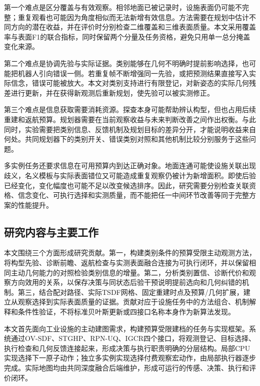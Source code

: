 \documentclass[11pt,a4paper]{article}
\numberwithin{equation}{section}
\begin{document}
第一个难点是区分覆盖与有效观察。相邻地面已被记录时，设施表面仍可能不完整；重复观看也可能因为角度相似而无法新增有效信息。方法需要在规划中估计不同方向的潜在收益，并在评价时分别检查二维覆盖和三维表面质量。本文采用覆盖率与表面F1的联合指标，同时保留两个分量及任务资格，避免只用单一总分掩盖变化来源。

第二个难点是协调先验与实际证据。类别能够在几何不明确时提前影响选择，也可能把机器人引向错误一侧。若重复帧不断增强同一先验，或把预测结果直接写入实际信念，错误可能被放大。本文对类别支持进行有限登记，对新姿态的实际几何残差进行更新，并在获得新观测后重新规划，使先验可以被实测修正。

第三个难点是信息获取需要消耗资源。探查本身可能帮助辨认构型，但也占用后续重建和返航预算。规划器需要在当前观察收益与未来判断改善之间作出权衡。与此同时，实验需要把类别信息、反馈机制及规划目标的差异分开，才能说明收益来自何处。共同规划器下的类别开关、错误类别对照和其他机制比较分别服务于这些问题。

多实例任务还要求信息在可用预算内到达正确对象。地面连通可能使设施关联出现歧义，名义模板与实际表面错位又可能造成重复观察仍被计为新增面积。即使后验已经变化，变化幅度也可能不足以改变候选排序。因此，研究需要分别检查关联资格、信念变化、可执行选择和实测质量，而不能把任一中间环节改善等同于完整方案的性能提升。

\hypertarget{ux7814ux7a76ux5185ux5bb9ux4e0eux4e3bux8981ux5de5ux4f5c}{%
\subsection{研究内容与主要工作}\label{ux7814ux7a76ux5185ux5bb9ux4e0eux4e3bux8981ux5de5ux4f5c}}

本文围绕三个方面形成研究贡献。第一，构建类别条件的预算受限主动观测方法，将构型先验、诊断前瞻、返航检查与实测表面融合连接为可执行闭环，并以保留相同主动几何能力的对照检验类别信息的增量。第二，分析类别置信、诊断代价和观察方向效用的关系，以保存决策与同状态后验干预说明提前选向和几何纠错的机制。第三，结合配对路径、实际TSDF网格、固定重建时点及预算/几何扩展，建立从观察选择到实际表面质量的证据。贡献对应于设施任务中的方法组合、机制解释和条件性验证，不将标准贝叶斯更新或四接口名称本身作为新算法发现。

本文首先面向工业设施的主动建图需求，构建预算受限建档的任务与实现框架。系统通过OV-SDF、STGHP、RPN-UQ、IGCR四个接口，将观测登记、目标选择、执行检查和几何反馈连接起来，形成决策与执行职责明确的分层结构。局部CPU实现选择下一原子动作；独立多实例实现选择付费观察宏动作，由局部执行器逐步完成。实际地图均由共同深度融合后端维护，形成可运行的传感、决策、执行和评价闭环。
\end{document}
